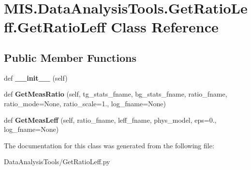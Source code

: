 \hypertarget{classMIS_1_1DataAnalysisTools_1_1GetRatioLeff_1_1GetRatioLeff}{}\section{M\+I\+S.\+Data\+Analysis\+Tools.\+Get\+Ratio\+Leff.\+Get\+Ratio\+Leff Class Reference}
\label{classMIS_1_1DataAnalysisTools_1_1GetRatioLeff_1_1GetRatioLeff}
\subsection*{Public Member Functions}
\begin{DoxyCompactItemize}
\item 
\mbox{\label{classMIS_1_1DataAnalysisTools_1_1GetRatioLeff_1_1GetRatioLeff_abd8b4b2dc89a4a3ce762b82d871da42a}} 
def {\bfseries \+\_\+\+\_\+init\+\_\+\+\_\+} (self)
\item 
\mbox{\label{classMIS_1_1DataAnalysisTools_1_1GetRatioLeff_1_1GetRatioLeff_a6dbbbc477c8bceb9a0d2b6f9ecc4abd4}} 
def {\bfseries Get\+Meas\+Ratio} (self, tg\+\_\+stats\+\_\+fname, bg\+\_\+stats\+\_\+fname, ratio\+\_\+fname, ratio\+\_\+mode=None, ratio\+\_\+scale=1., log\+\_\+fname=None)
\item 
\mbox{\label{classMIS_1_1DataAnalysisTools_1_1GetRatioLeff_1_1GetRatioLeff_a6fad76d8475f0b6e12e6719ca2c9c490}} 
def {\bfseries Get\+Meas\+Leff} (self, ratio\+\_\+fname, leff\+\_\+fname, phys\+\_\+model, eps=0., log\+\_\+fname=None)
\end{DoxyCompactItemize}


The documentation for this class was generated from the following file\+:\begin{DoxyCompactItemize}
\item 
Data\+Analysis\+Tools/Get\+Ratio\+Leff.\+py\end{DoxyCompactItemize}
